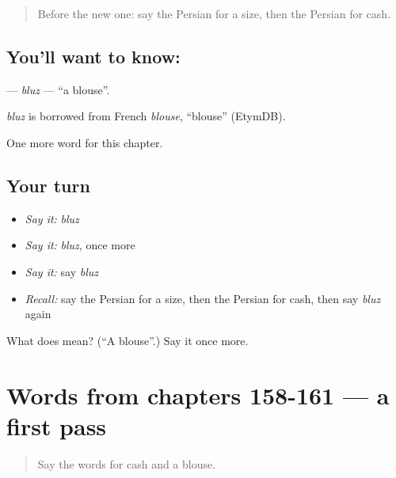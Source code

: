 \begin{quote}
Before the new one: say the Persian for a size, then the Persian for cash.
\end{quote}

\subsection*{You'll want to know: }
\textbf{} — \emph{bluz} — \textquotedblleft{}a blouse\textquotedblright{}.

\begin{cousinweb}
\emph{bluz} is borrowed from French \emph{blouse}, \textquotedblleft{}blouse\textquotedblright{} (EtymDB).
\end{cousinweb}

\begin{grammarlens}[title={What you've built}]
One more word for this chapter.
\end{grammarlens}

\subsection*{Your turn}
\begin{itemize}
\raggedright
  \item \emph{Say it:} \emph{bluz}
  \item \emph{Say it:} \emph{bluz}, once more
  \item \emph{Say it:} say \emph{bluz}
  \item \emph{Recall:} say the Persian for a size, then the Persian for cash, then say \emph{bluz} again
\end{itemize}

\begin{tcolorbox}[breakable,colback=teal!4,colframe=teal!35!black,title={Before you move on}]
What does  mean? (\textquotedblleft{}A blouse\textquotedblright{}.) Say it once more.
\end{tcolorbox}
\section[(dialogue)]{Words from chapters 158-161 — a first pass}

\label{lesson:FA-R166-first-pass-words-from-chapters-158-161}



\begin{quote}
Say the words for cash and a blouse.
\end{quote}

